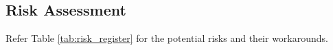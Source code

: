 \documentclass[conference, 12pt]{IEEEtran}
\begin{document}
\subsection{Risk Assessment}
Refer Table \ref{tab:risk_register} for the potential risks and their workarounds.





\end{document}
